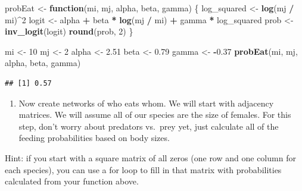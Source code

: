 \documentclass[
]{article}
\newenvironment{Shaded}{\begin{snugshade}}{\end{snugshade}}
\newcommand{\ControlFlowTok}[1]{\textcolor[rgb]{0.13,0.29,0.53}{\textbf{#1}}}
\newcommand{\DecValTok}[1]{\textcolor[rgb]{0.00,0.00,0.81}{#1}}
\newcommand{\FloatTok}[1]{\textcolor[rgb]{0.00,0.00,0.81}{#1}}
\newcommand{\FunctionTok}[1]{\textcolor[rgb]{0.13,0.29,0.53}{\textbf{#1}}}
\newcommand{\NormalTok}[1]{#1}
\newcommand{\OtherTok}[1]{\textcolor[rgb]{0.56,0.35,0.01}{#1}}
\newcommand{\SpecialCharTok}[1]{\textcolor[rgb]{0.81,0.36,0.00}{\textbf{#1}}}
\providecommand{\tightlist}{%
  \setlength{\itemsep}{0pt}\setlength{\parskip}{0pt}}
\begin{document}
\begin{Shaded}
\begin{Highlighting}[]
\NormalTok{probEat }\OtherTok{\textless{}{-}} \ControlFlowTok{function}\NormalTok{(mi, mj, alpha, beta, gamma) \{}
\NormalTok{  log\_squared }\OtherTok{\textless{}{-}} \FunctionTok{log}\NormalTok{(mj }\SpecialCharTok{/}\NormalTok{ mi)}\SpecialCharTok{\^{}}\DecValTok{2}
\NormalTok{  logit }\OtherTok{\textless{}{-}}\NormalTok{ alpha }\SpecialCharTok{+}\NormalTok{ beta }\SpecialCharTok{*} \FunctionTok{log}\NormalTok{(mj }\SpecialCharTok{/}\NormalTok{ mi) }\SpecialCharTok{+}\NormalTok{ gamma }\SpecialCharTok{*}\NormalTok{ log\_squared}
\NormalTok{  prob }\OtherTok{\textless{}{-}} \FunctionTok{inv\_logit}\NormalTok{(logit)}
  \FunctionTok{round}\NormalTok{(prob, }\DecValTok{2}\NormalTok{)}
\NormalTok{\}}

\NormalTok{mi }\OtherTok{\textless{}{-}} \DecValTok{10} 
\NormalTok{mj }\OtherTok{\textless{}{-}} \DecValTok{2}
\NormalTok{alpha }\OtherTok{\textless{}{-}} \FloatTok{2.51}
\NormalTok{beta }\OtherTok{\textless{}{-}} \FloatTok{0.79}
\NormalTok{gamma }\OtherTok{\textless{}{-}} \SpecialCharTok{{-}}\FloatTok{0.37}
\FunctionTok{probEat}\NormalTok{(mi, mj, alpha, beta, gamma)}
\end{Highlighting}
\end{Shaded}

\begin{verbatim}
## [1] 0.57
\end{verbatim}

\begin{enumerate}
\def\labelenumi{\alph{enumi}.}
\setcounter{enumi}{2}
\tightlist
\item
  Now create networks of who eats whom. We will start with adjacency
  matrices. We will assume all of our species are the size of females.
  For this step, don't worry about predators vs.~prey yet, just
  calculate all of the feeding probabilities based on body sizes.
\end{enumerate}

Hint: if you start with a square matrix of all zeros (one row and one
column for each species), you can use a for loop to fill in that matrix
with probabilities calculated from your function above.
\end{document}
